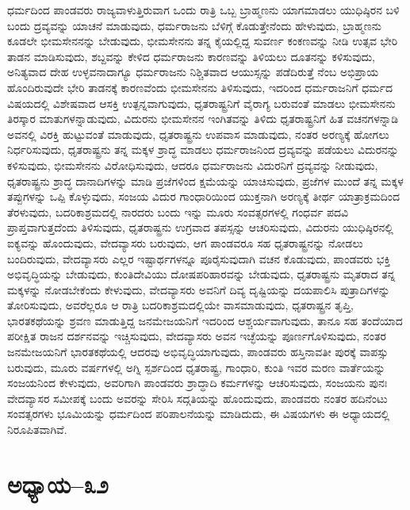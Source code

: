 ಧರ್ಮದಿಂದ ಪಾಂಡವರು ರಾಜ್ಯವಾಳುತ್ತಿರುವಾಗ ಒಂದು ರಾತ್ರಿ ಒಬ್ಬ ಬ್ರಾಹ್ಮಣನು ಯಾಗಮಾಡಲು ಯುಧಿಷ್ಠಿರನ ಬಳಿ ಬಂದು ದ್ರವ್ಯವನ್ನು ಯಾಚನೆ ಮಾಡುವುದು, ಧರ್ಮರಾಜನು ಬೆಳಿಗ್ಗೆ ಕೊಡುತ್ತೇನೆಂದು ಹೇಳುವುದು, ಬ್ರಾಹ್ಮಣನು ಕೂಡಲೇ ಭೀಮಸೇನನನ್ನು ಬೇಡುವುದು, ಭೀಮಸೇನನು ತನ್ನ ಕೈಯಲ್ಲಿದ್ದ ಸುವರ್ಣ ಕಂಕಣವನ್ನು ನೀಡಿ ಉತ್ಸವ ಭೇರಿ ತಾಡನ ಮಾಡಿಸುವುದು, ಶಬ್ದವನ್ನು ಕೇಳಿದ ಧರ್ಮರಾಜನು ಕಾರಣವನ್ನು ತಿಳಿಯಲು ದೂತನನ್ನು ಕಳಿಸುವುದು, ಅನಿತ್ಯವಾದ ದೇಹ ಉಳ್ಳವನಾದಾಗ್ಯೂ ಧರ್ಮರಾಜನು ನಿಶ್ಚಿತವಾದ ಆಯುಸ್ಸನ್ನು ಪಡೆದಿರುತ್ತೆ ನೆಂಬ ಅಭಿಪ್ರಾಯ ಹೊಂದಿರುವುದೇ ಭೇರಿ ತಾಡನಕ್ಕೆ ಕಾರಣವೆಂದು ಭೀಮಸೇನನು ತಿಳಿಸುವುದು, ಇದರಿಂದ ಧರ್ಮರಾಜನಿಗೆ ಧರ್ಮದ ವಿಷಯದಲ್ಲಿ ವಿಶೇಷವಾದ ಆಸಕ್ತಿ ಉತ್ಪನ್ನವಾಗುವುದು, ಧೃತರಾಷ್ಟ್ರನಿಗೆ ವೈರಾಗ್ಯ ಬರುವಂತೆ ಮಾಡಲು ಭೀಮಸೇನನು ತಿರಸ್ಕಾರ ಮಾತುಗಳನ್ನಾಡುವುದು, ವಿದುರನು ಭೀಮಸೇನನ ಇಂಗಿತವನ್ನು ತಿಳಿದು ಧೃತರಾಷ್ಟ್ರನಿಗೆ ಹಿತ ವಚನಗಳನ್ನಾಡಿ ಅವನಲ್ಲಿ ವಿರಕ್ತಿ ಹುಟ್ಟುವಂತೆ ಮಾಡುವುದು, ಧೃತರಾಷ್ಟ್ರನು ಉಪವಾಸ ಮಾಡುವುದು, ನಂತರ ಅರಣ್ಯಕ್ಕೆ ಹೋಗಲು ನಿರ್ಧರಿಸುವುದು, ಧೃತರಾಷ್ಟ್ರನು ತನ್ನ ಮಕ್ಕಳ ಶ್ರಾದ್ಧ ಮಾಡಲು ಧರ್ಮರಾಜನಿಂದ ದ್ರವ್ಯವನ್ನು ಪಡೆಯಲು ವಿದುರನನ್ನು ಕಳಿಸುವುದು, ಭೀಮಸೇನನು ವಿರೋಧಿಸುವುದು, ಆದರೂ ಧರ್ಮರಾಜನು ವಿದುರನಿಗೆ ದ್ರವ್ಯವನ್ನು ನೀಡುವುದು, ಧೃತರಾಷ್ಟ್ರನು ಶ್ರಾದ್ಧ ದಾನಾದಿಗಳನ್ನು ಮಾಡಿ ಪ್ರಜೆಗಳಿಂದ ಕ್ಷಮೆಯನ್ನು ಯಾಚಿಸುವುದು, ಪ್ರಜೆಗಳ ಮುಂದೆ ತನ್ನ ಮಕ್ಕಳ ತಪ್ಪುಗಳನ್ನು ಒಪ್ಪಿ ಕೊಳ್ಳುವುದು, ಸಂಜಯ ವಿದುರ ಗಾಂಧಾರಿಯಿಂದ ಯುಕ್ತನಾಗಿ ಅರಣ್ಯಕ್ಕೆ ತೀರ್ಥ ಯಾತ್ರಾಕ್ರಮದಿಂದ ತೆರಳುವುದು, ಬದರಿಕಾಶ್ರಮದಲ್ಲಿ ನಾರದರು ಬಂದು ಇನ್ನು ಮೂರು ಸಂವತ್ಸರಗಳಲ್ಲಿ ಗಂಧರ್ವ ಪದವಿ ಪ್ರಾಪ್ತವಾಗುತ್ತದೆಂದು ತಿಳಿಸುವುದು, ಧೃತರಾಷ್ಟ್ರನು ಉಗ್ರವಾದ ತಪಸ್ಸನ್ನು ಆಚರಿಸುವುದು, ವಿದುರನು ಯುಧಿಷ್ಠಿರನಲ್ಲಿ ಐಕ್ಯವನ್ನು ಹೊಂದುವುದು, ವೇದವ್ಯಾಸರು ಬರುವುದು, ಆಗ ಪಾಂಡವರೂ ಸಹ ಧೃತರಾಷ್ಟ್ರನನ್ನು ನೋಡಲು ಬಂದಿರುವುದು, ವೇದವ್ಯಾಸರು ಎಲ್ಲರ ಇಷ್ಟಾರ್ಥಗಳನ್ನೂ ಪೂರೈಸುವುದಾಗಿ ವಚನ ಕೊಡುವುದು, ಪಾಂಡವರು ಭಕ್ತಿ ಅಭಿವೃದ್ಧಿಯನ್ನು ಬೇಡುವುದು, ಕುಂತಿದೇವಿಯು ದೋಷಪರಿಹಾರವನ್ನು ಬೇಡುವುದು, ಧೃತರಾಷ್ಟ್ರನು ಮೃತರಾದ ತನ್ನ ಮಕ್ಕಳನ್ನು ನೋಡಬೇಕೆಂದು ಕೇಳುವುದು, ವೇದವ್ಯಾಸರು ಅವನಿಗೆ ದಿವ್ಯ ದೃಷ್ಟಿಯನ್ನು ದಯಪಾಲಿಸಿ ಪುತ್ರಾದಿಗಳನ್ನು ತೋರಿಸುವುದು, ಅವರೆಲ್ಲರೂ ಆ ರಾತ್ರಿ ಬದರಿಕಾಶ್ರಮದಲ್ಲಿಯೇ ವಾಸಮಾಡುವುದು, ಧೃತರಾಷ್ಟ್ರನ ತೃಪ್ತಿ, ಭಾರತಕಥೆಯನ್ನು ಶ್ರವಣ ಮಾಡುತ್ತಿದ್ದ ಜನಮೇಜಯನಿಗೆ ಇದರಿಂದ ಆಶ್ಚರ್ಯವಾಗುವುದು, ತಾನೂ ಸಹ ತಂದೆಯಾದ ಪರೀಕ್ಷಿತ ರಾಜನ ದರ್ಶನವನ್ನು ಇಚ್ಚಿಸುವುದು, ವೇದವ್ಯಾಸರು ಅವನ ಇಚ್ಛೆಯನ್ನು ಪೂರ್ಣಗೊಳಿಸುವುದು, ನಂತರ ಜನಮೇಜಯನಿಗೆ ಭಾರತಕಥೆಯಲ್ಲಿ ಆದರವು ಅಭಿವೃದ್ಧಿಯಾಗುವುದು, ಪಾಂಡವರು ಹಸ್ತಿನಾವತೀ ಪುರಕ್ಕೆ ವಾಪಸ್ಸು ಬರುವುದು, ಮೂರು ವರ್ಷಗಳಲ್ಲಿ ಅಗ್ನಿ ಸ್ಪರ್ಶದಿಂದ ಧೃತರಾಷ್ಟ್ರ, ಗಾಂಧಾರಿ, ಕುಂತಿ ಇವರ ಮರಣ ವಾರ್ತೆಯನ್ನು ಸಂಜಯನಿಂದ ಕೇಳುವುದು, ಅವರಿಗಾಗಿ ಪಾಂಡವರು ಶ್ರಾದ್ಧಾದಿ ಕರ್ಮಗಳನ್ನು ಆಚರಿಸುವುದು, ಸಂಜಯನು ಪುನಃ ವೇದವ್ಯಾಸರ ಸಮೀಪಕ್ಕೆ ಬಂದು ಅವರನ್ನು ಸೇರಿಸಿ ಸದ್ಗತಿಯನ್ನು ಹೊಂದುವುದು, ಪಾಂಡವರು ನಂತರ ಹದಿನೆಂಟು ಸಂವತ್ಸರಗಳು ಭೂಮಿಯನ್ನು ಧರ್ಮದಿಂದ ಪರಿಪಾಲನೆಯನ್ನು ಮಾಡಿದುದು, ಈ ವಿಷಯಗಳು ಈ ಅಧ್ಯಾಯದಲ್ಲಿ ನಿರೂಪಿತವಾಗಿವೆ.


\section{ಅಧ್ಯಾಯ–೩೨}

